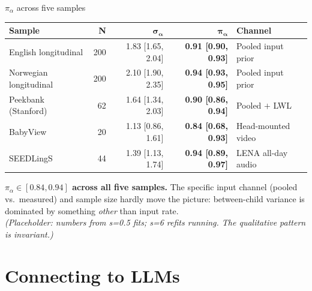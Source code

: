\documentclass[
  ignorenonframetext,
  aspectratio=169,
  t]{beamer}
\renewcommand{\arraystretch}{1.10}
\newcommand{\pia}{\pi_{\alpha}}
\newcommand{\siga}{\sigma_{\alpha}}
\begin{document}
\begin{frame}{\(\pia\) across five samples}
\label{pia-across-five-samples}
\centering
\small
\renewcommand{\arraystretch}{1.20}
\begin{tabular}{@{}lrrrl@{}}
\toprule
\textbf{Sample} & \textbf{N} & $\boldsymbol{\siga}$ & $\boldsymbol{\pia}$ & \textbf{Channel} \\
\midrule
English longitudinal & 200 & 1.83 [1.65, 2.04] & \textbf{0.91 [0.90, 0.93]} & Pooled input prior \\
Norwegian longitudinal & 200 & 2.10 [1.90, 2.35] & \textbf{0.94 [0.93, 0.95]} & Pooled input prior \\
Peekbank (Stanford) & 62  & 1.64 [1.34, 2.03] & \textbf{0.90 [0.86, 0.94]} & Pooled $+$ LWL \\
BabyView & 20  & 1.13 [0.86, 1.61] & \textbf{0.84 [0.68, 0.93]} & Head-mounted video \\
SEEDLingS & 44  & 1.39 [1.13, 1.74] & \textbf{0.94 [0.89, 0.97]} & LENA all-day audio \\
\bottomrule
\end{tabular}

\vspace{0.8em}
\begin{small}
\textbf{$\pia \in [0.84, 0.94]$ across all five samples.} The
specific input channel (pooled vs.\ measured) and sample size hardly
move the picture: between-child variance is dominated by something
\emph{other} than input rate.\\
\textcolor{black!50}{\textit{(Placeholder: numbers from s=0.5 fits; s=6 refits running.
The qualitative pattern is invariant.)}}
\end{small}
\end{frame}

\section{Connecting to LLMs}\label{connecting-to-llms}
\end{document}
